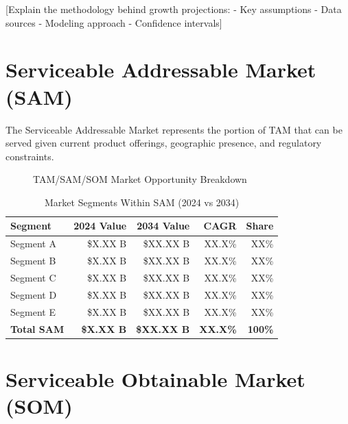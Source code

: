 \documentclass[11pt,letterpaper]{report}
\begin{document}
[Explain the methodology behind growth projections:
- Key assumptions
- Data sources
- Modeling approach
- Confidence intervals]

\section{Serviceable Addressable Market (SAM)}

The Serviceable Addressable Market represents the portion of TAM that can be served given current product offerings, geographic presence, and regulatory constraints.


\begin{figure}[htbp]
\centering
\caption{TAM/SAM/SOM Market Opportunity Breakdown}
\label{fig:tam_sam_som}
\end{figure}

\begin{table}[htbp]
\centering
\caption{Market Segments Within SAM (2024 vs 2034)}
\begin{tabular}{@{}lrrrr@{}}
\toprule
\textbf{Segment} & \textbf{2024 Value} & \textbf{2034 Value} & \textbf{CAGR} & \textbf{Share} \\
\midrule
Segment A & \$X.XX B & \$XX.XX B & XX.X\% & XX\% \\
\rowcolor{tablealt} Segment B & \$X.XX B & \$XX.XX B & XX.X\% & XX\% \\
Segment C & \$X.XX B & \$XX.XX B & XX.X\% & XX\% \\
\rowcolor{tablealt} Segment D & \$X.XX B & \$XX.XX B & XX.X\% & XX\% \\
Segment E & \$X.XX B & \$XX.XX B & XX.X\% & XX\% \\
\midrule
\textbf{Total SAM} & \textbf{\$X.XX B} & \textbf{\$XX.XX B} & \textbf{XX.X\%} & \textbf{100\%} \\
\bottomrule
\end{tabular}
\label{tab:sam_segments}
\end{table}

\section{Serviceable Obtainable Market (SOM)}
\end{document}
